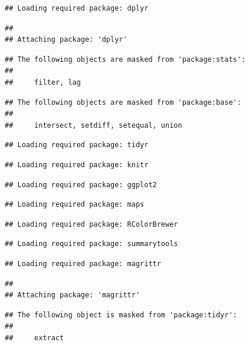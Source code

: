 \documentclass[]{article}
\begin{document}
\begin{verbatim}
## Loading required package: dplyr
\end{verbatim}

\begin{verbatim}
## 
## Attaching package: 'dplyr'
\end{verbatim}

\begin{verbatim}
## The following objects are masked from 'package:stats':
## 
##     filter, lag
\end{verbatim}

\begin{verbatim}
## The following objects are masked from 'package:base':
## 
##     intersect, setdiff, setequal, union
\end{verbatim}

\begin{verbatim}
## Loading required package: tidyr
\end{verbatim}

\begin{verbatim}
## Loading required package: knitr
\end{verbatim}

\begin{verbatim}
## Loading required package: ggplot2
\end{verbatim}

\begin{verbatim}
## Loading required package: maps
\end{verbatim}

\begin{verbatim}
## Loading required package: RColorBrewer
\end{verbatim}

\begin{verbatim}
## Loading required package: summarytools
\end{verbatim}

\begin{verbatim}
## Loading required package: magrittr
\end{verbatim}

\begin{verbatim}
## 
## Attaching package: 'magrittr'
\end{verbatim}

\begin{verbatim}
## The following object is masked from 'package:tidyr':
## 
##     extract
\end{verbatim}
\end{document}
